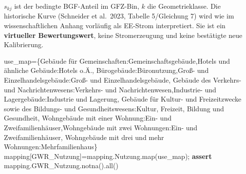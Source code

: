 \documentclass[
  ngerman,
  a4paper,
  DIV=11]{scrreprt}
\newenvironment{Shaded}{\begin{snugshade}}{\end{snugshade}}
\newcommand{\BuiltInTok}[1]{\textcolor[rgb]{0.00,0.23,0.31}{#1}}
\newcommand{\ControlFlowTok}[1]{\textcolor[rgb]{0.00,0.23,0.31}{\textbf{#1}}}
\newcommand{\NormalTok}[1]{\textcolor[rgb]{0.00,0.23,0.31}{#1}}
\newcommand{\OperatorTok}[1]{\textcolor[rgb]{0.37,0.37,0.37}{#1}}
\newcommand{\StringTok}[1]{\textcolor[rgb]{0.13,0.47,0.30}{#1}}
\begin{document}
\(s_{kj}\) ist der bedingte BGF-Anteil im GFZ-Bin, \(k\) die
Geometrieklasse. Die historische Kurve (Schneider et al.~2023, Tabelle
5/Gleichung 7) wird wie im wissenschaftlichen Anhang vorläufig als
EE-Strom interpretiert. Sie ist ein \textbf{virtueller Bewertungswert},
keine Stromerzeugung und keine bestätigte neue Kalibrierung.

\begin{Shaded}
\begin{Highlighting}[]
\NormalTok{use\_map}\OperatorTok{=}\NormalTok{\{}\StringTok{\textquotesingle{}Gebäude für Gemeinschaften\textquotesingle{}}\NormalTok{:}\StringTok{\textquotesingle{}Gemeinschaftsgebäude\textquotesingle{}}\NormalTok{,}\StringTok{\textquotesingle{}Hotels und ähnliche Gebäude\textquotesingle{}}\NormalTok{:}\StringTok{\textquotesingle{}Hotels o.Ä.\textquotesingle{}}\NormalTok{,}
 \StringTok{\textquotesingle{}Bürogebäude\textquotesingle{}}\NormalTok{:}\StringTok{\textquotesingle{}Büronutzung\textquotesingle{}}\NormalTok{,}\StringTok{\textquotesingle{}Groß{-} und Einzelhandelsgebäude\textquotesingle{}}\NormalTok{:}\StringTok{\textquotesingle{}Groß{-} und Einzelhandelsgebäude\textquotesingle{}}\NormalTok{,}
 \StringTok{\textquotesingle{}Gebäude des Verkehrs{-} und Nachrichtenwesens\textquotesingle{}}\NormalTok{:}\StringTok{\textquotesingle{}Verkehrs{-} und Nachrichtenwesen\textquotesingle{}}\NormalTok{,}\StringTok{\textquotesingle{}Industrie{-} und Lagergebäude\textquotesingle{}}\NormalTok{:}\StringTok{\textquotesingle{}Industrie und Lagerung\textquotesingle{}}\NormalTok{,}
 \StringTok{\textquotesingle{}Gebäude für Kultur{-} und Freizeitzwecke sowie des Bildungs{-} und Gesundheitswesens\textquotesingle{}}\NormalTok{:}\StringTok{\textquotesingle{}Kultur, Freizeit, Bildung und Gesundheit\textquotesingle{}}\NormalTok{,}
 \StringTok{\textquotesingle{}Wohngebäude mit einer Wohnung\textquotesingle{}}\NormalTok{:}\StringTok{\textquotesingle{}Ein{-} und Zweifamilienhäuser\textquotesingle{}}\NormalTok{,}\StringTok{\textquotesingle{}Wohngebäude mit zwei Wohnungen\textquotesingle{}}\NormalTok{:}\StringTok{\textquotesingle{}Ein{-} und Zweifamilienhäuser\textquotesingle{}}\NormalTok{,}
 \StringTok{\textquotesingle{}Wohngebäude mit drei und mehr Wohnungen\textquotesingle{}}\NormalTok{:}\StringTok{\textquotesingle{}Mehrfamilienhaus\textquotesingle{}}\NormalTok{\}}
\NormalTok{mapping[}\StringTok{\textquotesingle{}GWR\_Nutzung\textquotesingle{}}\NormalTok{]}\OperatorTok{=}\NormalTok{mapping.Nutzung.}\BuiltInTok{map}\NormalTok{(use\_map)}\OperatorTok{;} \ControlFlowTok{assert}\NormalTok{ mapping.GWR\_Nutzung.notna().}\BuiltInTok{all}\NormalTok{()}

\end{Highlighting}
\end{Shaded}
\end{document}
